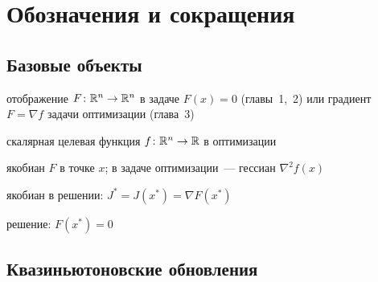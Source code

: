 
\chapter*{Обозначения и сокращения}

\section*{Базовые объекты}

\begin{description}[leftmargin=5.5em,labelwidth=5em,labelindent=0pt,font=\normalfont]
  \item[$F$]       отображение $F\colon \mathbb{R}^n \to \mathbb{R}^n$ в задаче $F(x)=0$
                   (главы~1,~2) или градиент $F = \nabla f$ задачи оптимизации (глава~3)
  \item[$f$]       скалярная целевая функция $f\colon\mathbb{R}^n\to\mathbb{R}$ в оптимизации
  \item[$J(x)$]    якобиан $F$ в точке $x$; в задаче оптимизации~--- гессиан $\nabla^2 f(x)$
  \item[$J^*$]     якобиан в решении: $J^* = J(x^*) = \nabla F(x^*)$
  \item[$x^*$]     решение: $F(x^*)=0$
\end{description}

\section*{Квазиньютоновские обновления}

